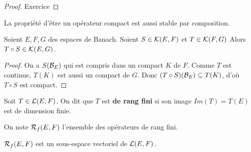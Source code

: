 \begin{proof}

	Exercice




\end{proof}

La propriété d'être un opérateur compact est aussi stable par composition.

\begin{proposition}
	Soient $E, F, G$ des espaces de Banach.
	Soient $S \in \mathcal{K}(E, F)$ et $T \in \mathcal{K}(F, G)$
	Alors $T \circ S \in \mathcal{K}(E, G)$.
\end{proposition}

\begin{proof}
	On a $S(\mathcal{B}_{E})$ qui est compris dans un compact $K$ de $F$. Comme $T$ est
	continue, $T(K)$ est aussi un compact de $G$. Donc $(T \circ
	S)(\mathcal{B}_{E}) \subseteq T(K)$, d'où $T \circ S$ est compact.
\end{proof}

\begin{definition}
	Soit $T \in \mathcal{L}(E, F)$. On dit que $T$ est \textbf{de rang fini}
	si son image $Im(T) = T(E)$ est de dimension finie.

	On note $\mathcal{R}_{f}(E, F)$ l'ensemble des opérateurs de rang fini.
\end{definition}

\begin{proposition}
	$\mathcal{R}_{f}(E, F)$ est un sous-espace vectoriel de
	$\mathcal{L}(E, F)$.
\end{proposition}

